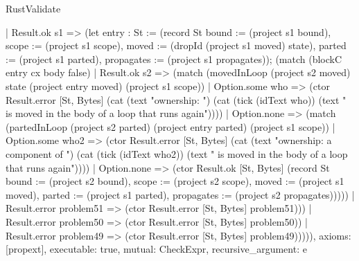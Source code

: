 \begin{lexlean}{RustValidate}
\begin{semanticmodule}
{        | Result.ok s1 => (let entry : St := (record St {bound := (project s1 bound), scope := (project s1 scope), moved := (dropId (project s1 moved) state), parted := (project s1 parted), propagates := (project s1 propagates)}); (match (blockC entry cx body false)
          | Result.ok s2 => (match (movedInLoop (project s2 moved) state (project entry moved) (project s1 scope))
            | Option.some who => (ctor Result.error [St, Bytes] (cat (text "ownership: ") (cat (tick (idText who)) (text " is moved in the body of a loop that runs again"))))
            | Option.none => (match (partedInLoop (project s2 parted) (project entry parted) (project s1 scope))
              | Option.some who2 => (ctor Result.error [St, Bytes] (cat (text "ownership: a component of ") (cat (tick (idText who2)) (text " is moved in the body of a loop that runs again"))))
              | Option.none => (ctor Result.ok [St, Bytes] (record St {bound := (project s2 bound), scope := (project s2 scope), moved := (project s1 moved), parted := (project s1 parted), propagates := (project s2 propagates)}))))
          | Result.error problem51 => (ctor Result.error [St, Bytes] problem51)))
        | Result.error problem50 => (ctor Result.error [St, Bytes] problem50))
      | Result.error problem49 => (ctor Result.error [St, Bytes] problem49))))),
  axioms: [propext],
  executable: true,
  mutual: CheckExpr,
  recursive_argument: e
}


\end{semanticmodule}
\end{lexlean}
